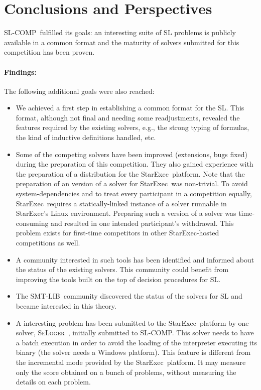 \documentclass[twoside,11pt]{article}
\newcommand{\smtlib}{\textsf{SMT-LIB}}
\newcommand{\slcomp}{\textsf{SL-COMP}}
\newcommand{\starexec}{\textsf{StarExec}}
\begin{document}
\section{Conclusions and Perspectives}

\slcomp\ fulfilled its goals:
an interesting suite of SL problems is publicly available in a common format and
the maturity of solvers submitted for this competition has been proven.

\paragraph{Findings:}
The following additional goals were also reached:
\begin{itemize}
\item We achieved a first step in establishing a common format for the SL. 
This format, although not final and needing some readjustments, revealed the features required by the existing solvers, e.g., the strong typing of formulas, the kind of inductive definitions handled, etc.

\item Some of the competing solvers have been improved (extensions, bugs fixed) during the preparation of this competition. They also gained experience with the preparation of a distribution for the \starexec\ platform. Note that the preparation of an version of a solver for \starexec\ was non-trivial. To avoid system-dependencies and to treat every participant in a competition equally, \starexec\ requires a 
statically-linked instance of a solver runnable in \starexec's Linux environment. Preparing such a version
of a solver was time-consuming and resulted in one intended participant's withdrawal. This problem
exists for first-time competitors in other \starexec-hosted competitions as well.

\item A community interested in such tools has been identified and informed about the status of the existing solvers. This community could benefit from improving the tools built on the top of decision procedures for SL.

\item The \smtlib\ community discovered the status of the solvers for SL and became interested in this theory.

\item A interesting problem has been submitted to the \starexec\ platform by one solver, \textsc{SeLoger}~\cite{HasseIOP13}, initially submitted to \slcomp. This solver needs to have a batch execution in order to avoid the loading of the interpreter executing its binary (the solver needs a Windows platform).
This feature is different from the incremental mode provided by the \starexec\ platform. It may measure only the score obtained on a bunch of problems, without measuring the details on each problem. 

\end{itemize}
\end{document}
